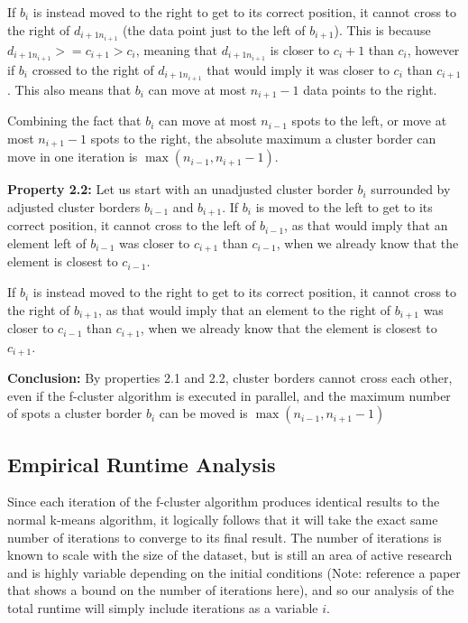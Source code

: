 \documentclass[conference]{IEEEtran}
\begin{document}
If $b_i$ is instead moved to the right to get to its correct position, it cannot cross to the right of $d_{i+1n_{i+1}}$ (the data point just to the left of $b_{i+1}$).
This is because $d_{i+1n_{i+1}} >= c_{i+1} > c_i$, meaning that $d_{i+1n_{i+1}}$ is closer to $c_i+1$ than $c_i$,
however if $b_i$ crossed to the right of $d_{i+1n_{i+1}}$ that would imply it was closer to $c_i$ than $c_{i+1}$.
This also means that $b_i$ can move at most $n_{i+1}-1$ data points to the right.

Combining the fact that $b_i$ can move at most $n_{i-1}$ spots to the left, or move at most $n_{i+1}-1$ spots to the right, the absolute maximum a cluster border can move in one iteration is $\max(n_{i-1}, n_{i+1}-1)$.

\textbf{Property 2.2:}
Let us start with an unadjusted cluster border $b_i$ surrounded by adjusted cluster borders $b_{i-1}$ and $b_{i+1}$.
If $b_i$ is moved to the left to get to its correct position, it cannot cross to the left of $b_{i-1}$,
as that would imply that an element left of $b_{i-1}$ was closer to $c_{i+1}$ than $c_{i-1}$, when we already know that the element is closest to $c_{i-1}$.

If $b_i$ is instead moved to the right to get to its correct position, it cannot cross to the right of $b_{i+1}$,
as that would imply that an element to the right of $b_{i+1}$ was closer to $c_{i-1}$ than $c_{i+1}$, when we already know that the element is closest to $c_{i+1}$.

\textbf{Conclusion:}
By properties 2.1 and 2.2, cluster borders cannot cross each other, even if the f-cluster algorithm is executed in parallel, and the maximum number of spots a cluster border $b_i$ can be moved is $\max(n_{i-1}, n_{i+1}-1)$

\subsection{Empirical Runtime Analysis}
Since each iteration of the f-cluster algorithm produces identical results to the normal k-means algorithm,
it logically follows that it will take the exact same number of iterations to converge to its final result.
The number of iterations is known to scale with the size of the dataset,
 but is still an area of active research and is highly variable depending on the initial conditions
 (Note: reference a paper that shows a bound on the number of iterations here),
 and so our analysis of the total runtime will simply include iterations as a variable $i$. 
 \par
\end{document}
